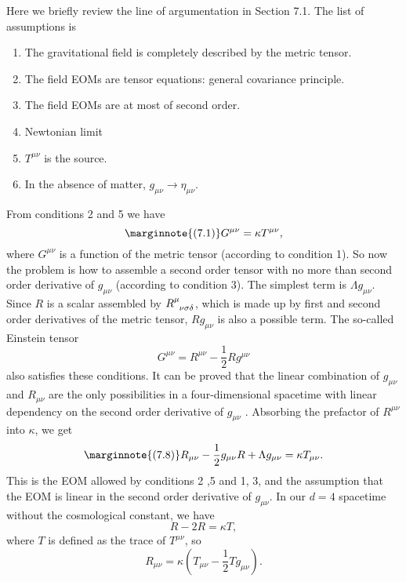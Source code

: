 \documentclass[hyperref, a4paper]{article}
\begin{document}
Here we briefly review the line of argumentation in Section 7.1. 
The list of assumptions is 
\begin{enumerate}
    \item The gravitational field is completely described by the metric tensor.
    \item The field EOMs are tensor equations: general covariance principle.
    \item The field EOMs are at most of second order.
    \item Newtonian limit
    \item $T^{\mu \nu}$ is the source.
    \item In the absence of matter, $g_{\mu \nu} \to \eta_{\mu \nu}$.
\end{enumerate}

From conditions 2 and 5 we have 
\begin{equation} \marginnote{(7.1)}
    G^{\mu \nu} = \kappa T^{\mu \nu},
\end{equation}
where $G^{\mu \nu}$ is a function of the metric tensor (according to condition 1). So now the problem is how to 
assemble a second order tensor with no more than second order derivative of $g_{\mu \nu}$ (according to 
condition 3). The simplest term is $\Lambda g_{\mu \nu}$. Since $R$ is a scalar assembled by 
$R\indices{^\mu_{\nu \sigma \delta}}$, which is made up by first and second order derivatives of the metric tensor,
$R g_{\mu \nu}$ is also a possible term. The so-called Einstein tensor 
\begin{equation}
    G^{\mu \nu} = R^{\mu \nu} - \frac{1}{2} R g^{\mu \nu}
\end{equation}
also satisfies these conditions. It can be proved that the linear combination of $g_{\mu \nu}$ and $R_{\mu \nu}$ are the only possibilities
in a four-dimensional spacetime with linear dependency on the second order derivative of $g_{\mu \nu}$ \cite{lovelock1972four}.
Absorbing the prefactor of $R^{\mu \nu}$ into $\kappa$, we get 
\begin{equation} \marginnote{(7.8)}
    R_{\mu \nu}-\frac{1}{2} g_{\mu \nu} R+\Lambda g_{\mu \nu} = \kappa T_{\mu \nu}.
    \label{eq:cosmos-constant}
\end{equation}
This is the EOM allowed by conditions 2 ,5 and 1, 3, and the assumption that the EOM is linear 
in the second order derivative of $g_{\mu \nu}$. In our $d=4$ spacetime without the cosmological
constant, we have 
\[
    R - 2 R = \kappa T,
\]
where $T$ is defined as the trace of $T^{\mu \nu}$, so 
\begin{equation}
    R_{\mu \nu} = \kappa \left(T_{\mu \nu} - \frac{1}{2} T g_{\mu \nu} \right).
    \label{eq:t-to-r}
\end{equation}
\end{document}
